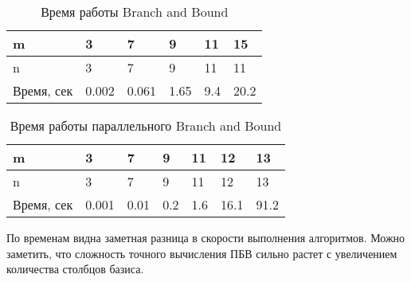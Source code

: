 \begin{table}[H]
  \caption{Время работы Branch and Bound}
  \centering
  \begin{tabular}{ | l | l | l | l | l | l | }
  \hline
  m & 3 & 7 & 9 & 11 & 15 \\ \hline
  n & 3 & 7 & 9 & 11 & 11 \\ \hline
  Время, сек & 0.002 & 0.061 & 1.65 & 9.4 & 20.2 \\ \hline
  \end{tabular}
  \label{table:BB}
\end{table}

\begin{table}[H]
  \caption{Время работы параллельного Branch and Bound}
  \centering
  \begin{tabular}{ | l | l | l | l | l | l | l | }
  \hline
  m & 3 & 7 & 9 & 11 & 12 & 13 \\ \hline
  n & 3 & 7 & 9 & 11 & 12 & 13 \\ \hline
  Время, сек & 0.001 & 0.01 & 0.2 & 1.6 & 16.1 & 91.2 \\ \hline
  \end{tabular}
  \label{table:BB_parallel}
\end{table}

По временам видна заметная разница в скорости выполнения алгоритмов. Можно заметить, что сложность точного вычисления ПБВ сильно растет с увеличением количества столбцов базиса.

\clearpage